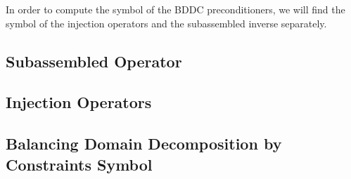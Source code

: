 In order to compute the symbol of the BDDC preconditioners, we will find the symbol of the injection operators and the subassembled inverse separately.

\subsection{Subassembled Operator}


\subsection{Injection Operators}


\subsection{Balancing Domain Decomposition by Constraints Symbol}

